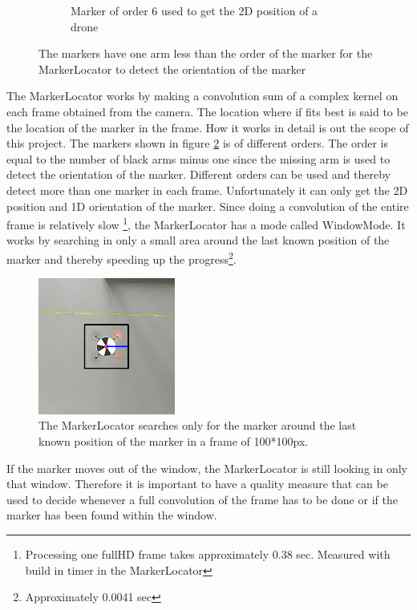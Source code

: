\begin{figure}[H]
\begin{subfigure}[b]{0.2\textwidth}
        \caption{Marker of order 6 used to get the 2D position of a drone}
        \label{fig:markerlocator_order_6}
    \end{subfigure}
    \caption{The markers have one arm less than the order of the marker for the MarkerLocator to detect the orientation of the marker}\label{fig:markerlocator_marker}
\end{figure}




The MarkerLocator works by making a convolution sum of a complex kernel on each frame obtained from the camera.
The location where if fits best is said to be the location of the marker in the frame.
How it works in detail is out the scope of this project.
The markers shown in figure \ref{fig:markerlocator_marker} is of different orders.
The order is equal to the number of black arms minus one since the missing arm is used to detect the orientation of the marker. 
Different orders can be used and thereby detect more than one marker in each frame. Unfortunately it can only get the 2D position and 1D orientation of the marker.
Since doing a convolution of the entire frame is relatively slow \footnote{Processing one fullHD frame takes approximately 0.38 sec. Measured with build in timer in the MarkerLocator}, the MarkerLocator has a mode called WindowMode.
It works by searching in only a small area around the last known position of the marker and thereby speeding up the progress\footnote{Approximately 0.0041 sec}. 

\begin{figure}[H]
    \center
    \includegraphics[width=0.4\textwidth]{graphics/markerlocator_window.png}
  	\caption{The MarkerLocator searches only for the marker around the last known position of the marker in a frame of 100*100px.}
    \label{markerlocator_windowmode}
\end{figure}
If the marker moves out of the window, the MarkerLocator is still looking in only that window.
Therefore it is important to have a quality measure that can be used to decide whenever a full convolution of the frame has to be done or if the marker has been found within the window. 

